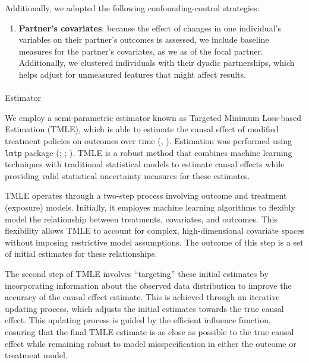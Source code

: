 \documentclass[
  singlecolumn]{article}
\makeatletter
\let\oldparagraph\paragraph
\renewcommand{\paragraph}{
    \@ifstar
      \xxxParagraphStar
      \xxxParagraphNoStar
  }
\newcommand{\xxxParagraphStar}[1]{\oldparagraph*{#1}\mbox{}}
\newcommand{\xxxParagraphNoStar}[1]{\oldparagraph{#1}\mbox{}}
\providecommand{\tightlist}{%
  \setlength{\itemsep}{0pt}\setlength{\parskip}{0pt}}\usepackage{longtable,booktabs,array}
\makeatother
\begin{document}
Additionally, we adopted the following confounding-control strategies:

\begin{enumerate}
\def\labelenumi{\arabic{enumi}.}
\setcounter{enumi}{5}
\tightlist
\item
  \textbf{Partner's covariates}: because the effect of changes in one
  individual's variables on their partner's outcomes is assessed, we
  include baseline measures for the partner's covariates, as we as of
  the focal partner. Additionally, we clustered individuals with their
  dyadic partnerships, which helps adjust for unmeasured features that
  might affect results.
\end{enumerate}

\paragraph{Estimator}\label{estimator}

We employ a semi-parametric estimator known as Targeted Minimum
Loss-based Estimation (TMLE), which is able to estimate the causal
effect of modified treatment policies on outcomes over time
(,
). Estimation was performed using
\texttt{lmtp} package (; ;
). TMLE is a robust
method that combines machine learning techniques with traditional
statistical models to estimate causal effects while providing valid
statistical uncertainty measures for these estimates.

TMLE operates through a two-step process involving outcome and treatment
(exposure) models. Initially, it employes machine learning algorithms to
flexibly model the relationship between treatments, covariates, and
outcomes. This flexibility allows TMLE to account for complex,
high-dimensional covariate spaces without imposing restrictive model
assumptions. The outcome of this step is a set of initial estimates for
these relationships.

The second step of TMLE involves ``targeting'' these initial estimates
by incorporating information about the observed data distribution to
improve the accuracy of the causal effect estimate. This is achieved
through an iterative updating process, which adjusts the initial
estimates towards the true causal effect. This updating process is
guided by the efficient influence function, ensuring that the final TMLE
estimate is as close as possible to the true causal effect while
remaining robust to model misspecification in either the outcome or
treatment model.
\end{document}
